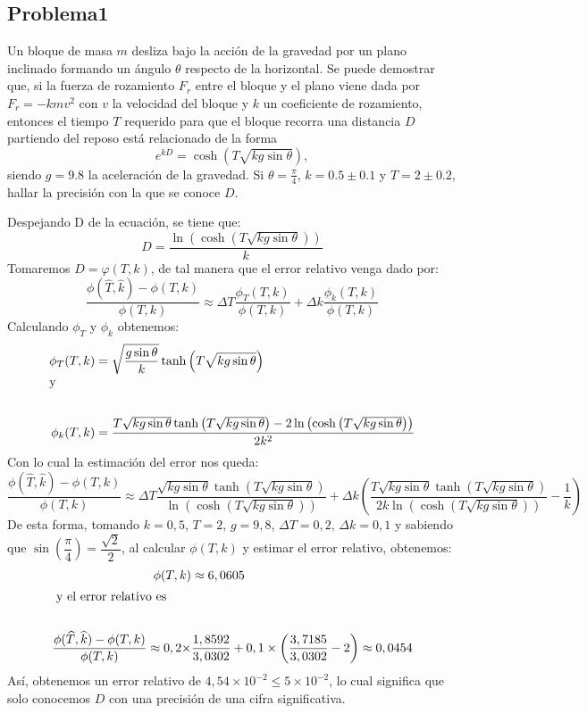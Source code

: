 \documentclass[12pt, a4paper]{article}%
\begin{document}
\subsection*{Problema1}
Un bloque de masa \( m \) desliza bajo la acción de la gravedad por un plano inclinado formando un ángulo \( \theta \) respecto de la horizontal. Se puede demostrar que, si la fuerza de rozamiento \( F_r \) entre el bloque y el plano viene dada por \( F_r = -k m v^2 \) con \( v \) la velocidad del bloque y \( k \) un coeficiente de rozamiento, entonces el tiempo \( T \) requerido para que el bloque recorra una distancia \( D \) partiendo del reposo está relacionado de la forma
\[
e^{kD} = \cosh\left(T \sqrt{k g \sin \theta}\right),
\]
siendo \( g = 9.8 \) la aceleración de la gravedad. Si \( \theta = \frac{\pi}{4} \), \( k = 0.5 \pm 0.1 \) y \( T = 2 \pm 0.2 \), hallar la precisión con la que se conoce \( D \).
\begin{solution}
    Despejando D de la ecuación, se tiene que:
    \[ D=\frac{\ln{\left(\cosh{\left(T\sqrt{kg\sin{\theta}}\right)}\right)}}{k}
    \]
    Tomaremos $D=\varphi(T,k)$, de tal manera que el error relativo venga dado por: 
    \[
    \frac{\phi(\widehat{T},\widehat{k})-\phi(T,k)}{\phi(T,k)}\approx \Delta T\frac{\phi_{T}(T,k)}{\phi(T,k)}+\Delta k\frac{\phi_{k}(T,k)}{\phi(T,k)}
    \]
    Calculando $\phi_{T}$ y $\phi_{k}$ obtenemos:
    \begin{align*}
        \phi_{T}(T,k)&=\sqrt{\frac{g\sin\theta}{k}}\tanh\left(T\sqrt{kg\sin\theta}\right)\\
        \intertext{y}\\
        \phi_{k}(T,k)&=\frac{T\sqrt{kg\sin\theta}\tanh\left(T\sqrt{kg\sin\theta}\right)-2\ln{\left(\cosh{\left(T\sqrt{kg\sin\theta}\right)}\right)}}{2k^2}
    \end{align*}
    Con lo cual la estimación del error nos queda:
    \[
    \frac{\phi(\widehat{T},\widehat{k})-\phi(T,k)}{\phi(T,k)}\approx \Delta T\frac{\sqrt{kg\sin\theta}\tanh\left(T\sqrt{kg\sin\theta}\right)}{\ln\left(\cosh{\left(T\sqrt{kg\sin\theta}\right)}\right)}+\Delta k\left(\frac{T\sqrt{kg\sin\theta}\tanh\left(T\sqrt{kg\sin\theta}\right)}{2k\ln\left(\cosh{\left(T\sqrt{kg\sin\theta}\right)}\right)}-\frac{1}{k}\right)
    \]
    De esta forma, tomando $k=0,5$, $T=2$, $g=9,8$, $\Delta T=0,2$, $\Delta k=0,1$ y sabiendo que $\sin\left(\dfrac{\pi}{4}\right)=\dfrac{\sqrt{2}}{2}$, al calcular $\phi(T,k)$ y estimar el error relativo, obtenemos:
    \begin{align*}
        \phi(T,k)& \approx 6,0605\\
        \intertext{ y el error relativo es}\\
        \frac{\phi(\widehat{T},\widehat{k})-\phi(T,k)}{\phi(T,k)}\approx 0,2\times&\frac{1,8592}{3,0302}+0,1\times\left(\frac{3,7185}{3,0302}-2\right)\approx 0,0454
    \end{align*}
    Así, obtenemos un error relativo de $4,54\times10^{-2}\leq5\times10^{-2}$, lo cual significa que solo conocemos $D$ con una precisión de una cifra significativa.
    \end{solution}
\end{document}

